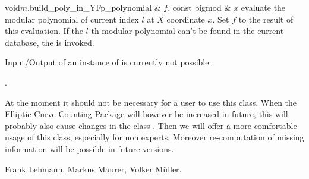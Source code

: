 \begin{fcode}{void}{$m$.build_poly_in_Y}{Fp_polynomial & $f$, const bigmod & $x$}
  evaluate the modular polynomial of current index $l$ at $X$ coordinate $x$.  Set $f$ to the
  result of this evaluation.  If the $l$-th modular polynomial can't be found in the current
  database, the \LEH is invoked.
\end{fcode}



\IO

Input/Output of an instance of  is currently not possible.



\SEEALSO

.



\NOTES

At the moment it should not be necessary for a user to use this class.  When the Elliptic Curve
Counting Package will however be increased in future, this will probably also cause changes in
the class .  Then we will offer a more comfortable usage of this class,
especially for non experts.  Moreover re-computation of missing information will be possible in
future versions.



\AUTHOR

Frank Lehmann, Markus Maurer, Volker M{\"u}ller.
